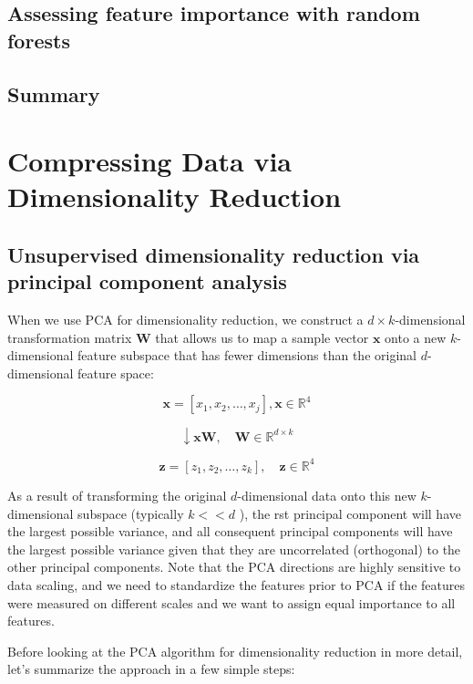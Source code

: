 \documentclass[letterpaper]{report}
\begin{document}
\section{Assessing feature importance with random forests}
\section{Summary}



\chapter{Compressing Data via Dimensionality Reduction}

\section{Unsupervised dimensionality reduction via principal component analysis}

When we use PCA for dimensionality reduction, we construct a $d \times k$-dimensional transformation matrix $\mathbf{W}$ that allows us to map a sample vector $\mathbf{x}$ onto a new $k$-dimensional feature subspace  that has fewer dimensions than the original $d$-dimensional feature space:

\[
\mathbf{x} = [ x_1, x_2, \dots, x_j], \mathbf{x} \in \mathbb{R}^4
\]

\[
\downarrow \mathbf{x W}, \quad \mathbf{W} \in \mathbb{R}^{d \times k}
\]

\[
\mathbf{z} = [z_1, z_2, \dots, z_k], \quad \mathbf{z} \in \mathbb{R}^4
\]

As a result of transforming the original $d$-dimensional data onto this new
$k$-dimensional subspace (typically $k << d$ ), the  rst principal component will have
the largest possible variance, and all consequent principal components will have the largest possible variance given that they are uncorrelated (orthogonal) to the other principal components. Note that the PCA directions are highly sensitive to data scaling, and we need to standardize the features prior to PCA if the features were measured on different scales and we want to assign equal importance to all features.

Before looking at the PCA algorithm for dimensionality reduction in more detail, let's summarize the approach in a few simple steps:
\end{document}
